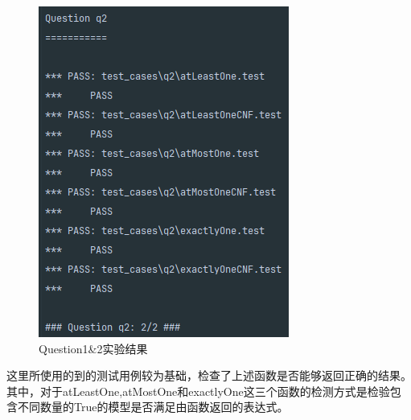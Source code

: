 \begin{figure}[!htbp]
\begin{minipage}[t]{0.4\textwidth}
    \centering
    \includegraphics[width=\textwidth]{pic/q2.png}
    \end{minipage}
    \caption{Question1\&2实验结果}\label{q12}
\end{figure}
这里所使用的到的测试用例较为基础，检查了上述函数是否能够返回正确的结果。
其中，对于atLeastOne,atMostOne和exactlyOne这三个函数的检测方式是检验包含不同数量的True的模型是否满足由函数返回的表达式。
%
%
